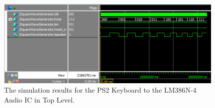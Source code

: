 \documentclass[a4paper]{article}
\begin{document}
\begin{figure}[h]
  \centering
    \includegraphics[width=0.98\textwidth]{sims/square_wave_generator/SquareWaveGenerator.png}
	\caption{The simulation results for the PS2 Keyboard to the LM386N-4 Audio IC in Top Level.}
    \label{fig:top-level-sim}
\end{figure}
\end{document}
